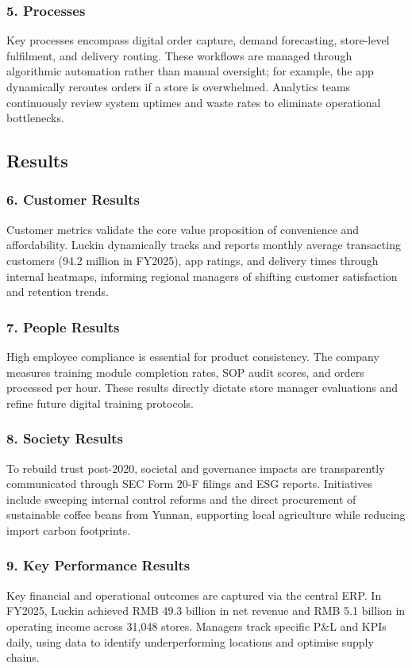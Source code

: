\documentclass[12pt,a4paper]{article}
\begin{document}
\subsubsection*{5. Processes}
Key processes encompass digital order capture, demand forecasting, store-level fulfilment, and delivery routing. These workflows are managed through algorithmic automation rather than manual oversight; for example, the app dynamically reroutes orders if a store is overwhelmed. Analytics teams continuously review system uptimes and waste rates to eliminate operational bottlenecks.

\subsection{Results}

\subsubsection*{6. Customer Results}
Customer metrics validate the core value proposition of convenience and affordability. Luckin dynamically tracks and reports monthly average transacting customers (94.2 million in FY2025), app ratings, and delivery times through internal heatmaps, informing regional managers of shifting customer satisfaction and retention trends.

\subsubsection*{7. People Results}
High employee compliance is essential for product consistency. The company measures training module completion rates, SOP audit scores, and orders processed per hour. These results directly dictate store manager evaluations and refine future digital training protocols.

\subsubsection*{8. Society Results}
To rebuild trust post-2020, societal and governance impacts are transparently communicated through SEC Form 20-F filings and ESG reports. Initiatives include sweeping internal control reforms and the direct procurement of sustainable coffee beans from Yunnan, supporting local agriculture while reducing import carbon footprints.

\subsubsection*{9. Key Performance Results}
Key financial and operational outcomes are captured via the central ERP. In FY2025, Luckin achieved RMB 49.3 billion in net revenue and RMB 5.1 billion in operating income across 31,048 stores. Managers track specific P\&L and KPIs daily, using data to identify underperforming locations and optimise supply chains.
\end{document}
